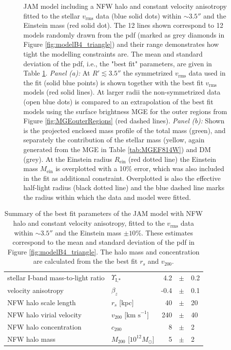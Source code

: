 \documentclass[useAMS,usenatbib]{mnras}
\begin{document}
\begin{figure}
\begin{subfigure}{.48\textwidth}
  \label{fig:modelB4_enclMass}
\end{subfigure}
\caption{JAM model including a NFW halo and constant velocity anisotropy fitted to the stellar $v_\text{rms}$ data (blue solid dots) within $\sim3.5''$ and the Einstein mass (red solid dot). The 12 lines shown correspond to 12 models randomly drawn from the pdf (marked as grey diamonds in Figure \ref{fig:modelB4_triangle}) and their range demonstrates how tight the modelling constraints are. The mean and standard deviation of the pdf, i.e., the "best fit" parameters, are given in Table \ref{tab:modelB4_bestfit}. \emph{Panel (a):} At $R'\lesssim 3.5''$ the symmetrized $v_\text{rms}$ data used in the fit (solid blue points) is shown together with the best fit $v_\text{rms}$ models (red solid lines). At larger radii the non-symmetrized data (open blue dots) is compared to an extrapolation of the best fit models using the surface brightness MGE for the outer regions from Figure \ref{fig:MGEouterRegions} (red dashed lines). \emph{Panel (b):} Shown is the projected enclosed mass profile of the total mass (green), and separately the contribution of the stellar mass (yellow, again generated from the MGE in Table \ref{tab:MGEF814W}) and DM (grey). At the Einstein radius $R_\text{ein}$ (red dotted line) the Einstein mass $M_\text{ein}$ is overplotted with a 10\% error, which was also included in the fit as additional constraint. Overplotted is also the effective half-light radius (black dotted line) and the blue dashed line marks the radius within which the data and model were fitted.}
\label{fig:modelB4_models}
\end{figure}

\begin{table}
\centering
\begin{tabular}{llrcl}
\hline
stellar I-band mass-to-light ratio & $\Upsilon_\text{I,*}$ & 4.2 & $\pm$ & 0.2\\
velocity anisotropy & $\beta_z$ & -0.4 & $\pm$ & 0.1 \\
NFW halo scale length & $r_s$ [kpc] & 40 & $\pm$ & 20\\
NFW halo virial velocity & $v_{200}$ [$\text{km s}^{-1}$] & 240 & $\pm$ & 40\\
NFW halo concentration & $c_{200}$ & 8 & $\pm$ & 2 \\
NFW halo mass & $M_{200}$ [$10^{12} M_\odot$] & 5 & $\pm$ & 2\\
\hline
\end{tabular}
\caption{Summary of the best fit parameters of the JAM model with NFW halo and constant velocity anisotropy, fitted to the $v_\text{rms}$ data within $\sim 3.5''$ and the Einstein mass $\pm10\%$. These estimates correspond to the mean and standard deviation of the pdf in Figure \ref{fig:modelB4_triangle}. The halo mass and concentration are calculated from the the best fit $r_s$ and $v_{200}$.}
\label{tab:modelB4_bestfit}
\end{table}
\end{document}
